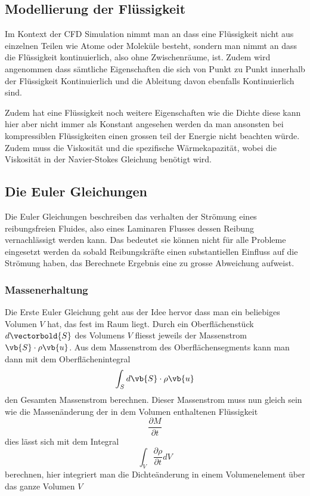 \subsection{Modellierung der Flüssigkeit}
Im Kontext der CFD Simulation nimmt man an dass eine Flüssigkeit nicht aus einzelnen Teilen wie Atome oder Moleküle besteht, sondern man nimmt an dass die Flüssigkeit kontinuierlich, also ohne Zwischenräume, ist. 
Zudem wird angenommen dass sämtliche Eigenschaften die sich von Punkt zu Punkt innerhalb der Flüssigkeit Kontinuierlich und die Ableitung davon ebenfalls Kontinuierlich sind. 

Zudem hat eine Flüssigkeit noch weitere Eigenschaften wie die Dichte diese kann hier aber nicht immer als Konstant angesehen werden da man ansonsten bei kompressiblen Flüssigkeiten einen grossen teil der Energie nicht beachten würde.
Zudem muss die Viskosität und die spezifische Wärmekapazität, wobei die Viskosität in der Navier-Stokes Gleichung benötigt wird.

\subsection{Die Euler Gleichungen}
Die Euler Gleichungen beschreiben das verhalten der Strömung eines reibungsfreien Fluides, also eines Laminaren Flusses dessen Reibung vernachlässigt werden kann. 
Das bedeutet sie können nicht für alle Probleme eingesetzt werden da sobald Reibungskräfte einen substantiellen Einfluss auf die Strömung haben, das Berechnete Ergebnis eine zu grosse Abweichung aufweist.

\subsubsection{Massenerhaltung}
Die Erste Euler Gleichung geht aus der Idee hervor dass man ein beliebiges Volumen $V$ hat, das fest im Raum liegt. Durch ein Oberflächenstück 
$d \vectorbold{S} $ 
des Volumens 
$V$
 fliesst jeweils der Massenstrom 
$\vb{S} \cdot\rho\vb{u}$.
Aus dem Massenstrom des Oberflächensegments kann man dann mit dem Oberflächenintegral 
\[\int_{S}d\vb{S}\cdot\rho\vb{u}\]
den Gesamten Massenstrom berechnen. Dieser Massenstrom muss nun gleich sein wie die Massenänderung der in dem Volumen enthaltenen Flüssigkeit 
\[\frac{\partial M}{\partial t}\]
dies lässt sich mit dem Integral 
\[\int_{V}\frac{\partial \rho}{\partial t} dV\]
berechnen, hier integriert man die Dichteänderung in einem Volumenelement über das ganze Volumen 
$V$ 

